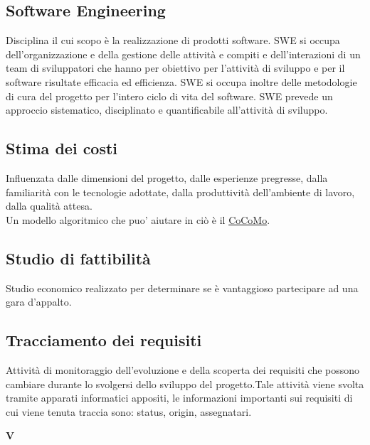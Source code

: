 	\subsection{Software Engineering}
	\label{sec:swe}
	Disciplina il cui scopo è la realizzazione di prodotti software.
	SWE si occupa dell'organizzazione e della gestione delle attività e compiti e dell'interazioni di un team di sviluppatori
	che hanno per obiettivo per l'attività di sviluppo e per il software risultate efficacia ed efficienza.	
	SWE si occupa inoltre delle metodologie di cura del progetto per l'intero ciclo di vita del software.
	SWE prevede un approccio sistematico, disciplinato e quantificabile all'attività di sviluppo.

	\subsection{Stima dei costi}
	\label{sec:stimacosti}
	Influenzata dalle dimensioni del progetto, dalle esperienze pregresse, dalla familiarità con le tecnologie adottate, dalla produttività dell'ambiente di lavoro, dalla qualità attesa. \\Un modello algoritmico che puo' aiutare in ciò è il \hyperref[sec:cocomo]{CoCoMo}.

	\subsection{Studio di fattibilità}
	\label{sec:studiofattibilita}
	Studio economico realizzato per determinare se è vantaggioso partecipare ad una gara d'appalto.\newpage

	\subsection{Tracciamento dei requisiti}
	\label{sec:tracciamentorequisiti}
	Attività di monitoraggio dell'evoluzione e della scoperta dei requisiti che possono cambiare durante lo svolgersi dello sviluppo del progetto.Tale attività viene svolta tramite apparati informatici appositi, le informazioni importanti sui requisiti di cui viene tenuta traccia sono: status, origin, assegnatari.\newpage

	{\Huge{\textbf{V}}} \\
